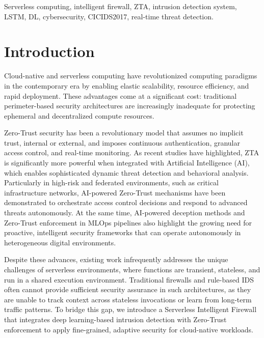 \documentclass[conference]{IEEEtran}
\begin{document}
\begin{IEEEkeywords}
Serverless computing, intelligent firewall, ZTA, intrusion detection system, LSTM, DL, cybersecurity, CICIDS2017, real-time threat detection.

\end{IEEEkeywords}


\section{Introduction}
Cloud-native and serverless computing have revolutionized computing paradigms in the contemporary era by enabling elastic scalability, resource efficiency, and rapid deployment. These advantages come at a significant cost: traditional perimeter-based security architectures are increasingly inadequate for protecting ephemeral and decentralized compute resources. %

Zero-Trust security has been a revolutionary model that assumes no implicit trust, internal or external, and imposes continuous authentication, granular access control, and real-time monitoring. As recent studies \cite{ajish2024significance} have highlighted, ZTA is significantly more powerful when integrated with Artificial Intelligence (AI), which enables sophisticated dynamic threat detection and behavioral analysis. Particularly in high-risk and federated environments, such as critical infrastructure networks, AI-powered Zero-Trust mechanisms have been demonstrated to orchestrate access control decisions and respond to advanced threats autonomously. At the same time, AI-powered deception methods \cite{article} and Zero-Trust enforcement in MLOps pipelines \cite{dowd2024securing} also highlight the growing need for proactive, intelligent security frameworks that can operate autonomously in heterogeneous digital environments.

Despite these advances, existing work infrequently addresses the unique challenges of serverless environments, where functions are transient, stateless, and run in a shared execution environment. Traditional firewalls and rule-based IDS often cannot provide sufficient security assurance in such architectures, as they are unable to track context across stateless invocations or learn from long-term traffic patterns. To bridge this gap, we introduce a Serverless Intelligent Firewall that integrates deep learning-based intrusion detection with Zero-Trust enforcement to apply fine-grained, adaptive security for cloud-native workloads.
\end{document}
